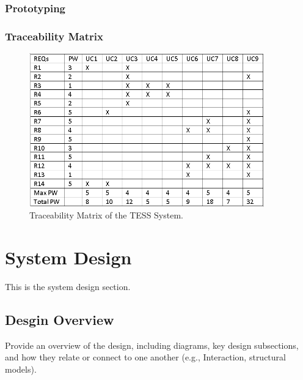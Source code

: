 \documentclass{article}
\begin{document}
\subsubsection{Prototyping}
\subsubsection{Traceability Matrix}

\begin{figure}[ht]\centering
\includegraphics[width=4.0in]{./Figure/Traceability_Matrix.PNG}
\caption{Traceability Matrix of the TESS System.}\label{fig:traceabilitymatrix}
\end{figure}

\section{System Design}
This is the system design section.

\subsection{Desgin Overview}
Provide an overview of the design, including diagrams, key design subsections, and how they relate or connect to one another (e.g., Interaction, structural models).
\end{document}
